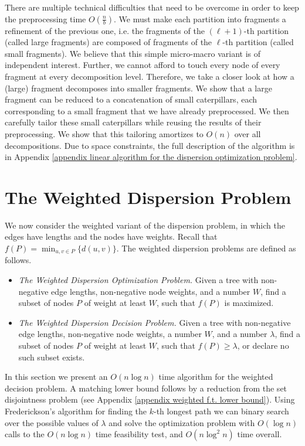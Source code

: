 \documentclass[a4paper,UKenglish]{lipics-v2016}
\theoremstyle{plain}
\begin{document}
There are multiple technical difficulties that need to be overcome in order to keep the preprocessing time $O(\frac{n}{b})$.
We must make each partition into fragments a refinement of the previous one, i.e. the fragments of the $(\ell+1)$-th partition (called large fragments)
are composed of fragments of the $\ell$-th partition (called small fragments). We believe that this simple micro-macro variant is of independent interest. 
Further, we cannot afford to touch every node of every fragment at every decomposition level. Therefore, we take a closer look at how a (large) fragment decomposes into smaller fragments. 
We show that a large fragment can be reduced to a concatenation of small caterpillars, each corresponding to a small fragment that we have already preprocessed. We then carefully tailor these small caterpillars while reusing the results of their preprocessing. We show that this tailoring amortizes to $O(n)$ over all decompositions. Due to space constraints, the full description of the algorithm is in Appendix \ref{appendix linear algorithm for the dispersion optimization problem}.

\section{The Weighted Dispersion Problem}\label{section:weighted}
We now consider the weighted variant of the dispersion problem, in which the edges have lengths and the nodes have weights. Recall that $f(P)=\min_{u,v\in P} \{d(u,v)\}$. The weighted dispersion problems are defined as follows.
\begin{itemize} 
\item {\em The Weighted Dispersion Optimization Problem.} Given a tree with non-negative edge lengths, non-negative node weights, and a number $W$, find a subset of nodes $P$ of weight at least $W$, such that  $f(P)$ is maximized. 

\item {\em The Weighted Dispersion Decision Problem.} Given a tree with non-negative edge lengths, non-negative node weights, a number $W$, and a number $\lambda$, find a subset of nodes  $P$ of weight at least $W$, such that $f(P)\geq\lambda$, or declare no such subset exists. 
\end{itemize}


In this section we present an $O(n\log n)$ time algorithm for the weighted decision problem. A matching lower bound follows by a reduction from the set disjointness problem (see Appendix \ref{appendix weighted f.t. lower bound}).
Using Frederickson's algorithm for finding the $k$-th longest path \cite{Frederickson1983} we can binary search over the possible values of $\lambda$ and solve the optimization problem with $O(\log n)$ calls to the $O(n \log n)$ time feasibility test, and $O(n\log^{2}n)$ time overall.
\end{document}
